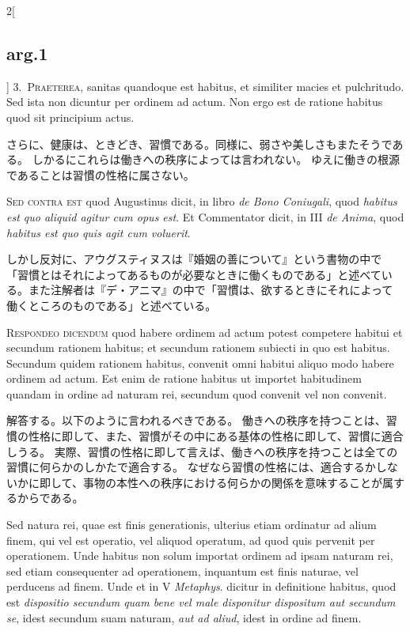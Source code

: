 \documentclass[paper=a4paper,fontsize=10pt,jafontsize=9pt,titlepage]{jlreq}
\begin{document}
\begin{paracol}{2}[\subsection{arg.1}]
3.~{\scshape Praeterea}, sanitas quandoque est habitus, et similiter macies et
pulchritudo. Sed ista non dicuntur per ordinem ad actum. Non ergo est
de ratione habitus quod sit principium actus.

\switchcolumn

さらに、健康は、ときどき、習慣である。同様に、弱さや美しさもまたそうである。
しかるにこれらは働きへの秩序によっては言われない。
ゆえに働きの根源であることは習慣の性格に属さない。

\switchcolumn*[\subsection{s.c.}]

{\scshape Sed contra est} quod Augustinus dicit, in libro {\itshape de Bono Coniugali}, quod
{\itshape habitus est quo aliquid agitur cum opus est}. Et Commentator dicit, in
III {\itshape de Anima}, quod {\itshape habitus est quo quis agit cum voluerit}.

\switchcolumn

しかし反対に、アウグスティヌスは『婚姻の善について』という書物の中で
「習慣とはそれによってあるものが必要なときに働くものである」と述べてい
る。また注解者は『デ・アニマ』の中で「習慣は、欲するときにそれによって
働くところのものである」と述べている。


{\scshape Respondeo dicendum} quod habere ordinem ad actum potest competere
habitui et secundum rationem habitus; et secundum rationem subiecti in
quo est habitus. Secundum quidem rationem habitus, convenit omni
habitui aliquo modo habere ordinem ad actum. Est enim de ratione
habitus ut importet habitudinem quandam in ordine ad naturam rei,
secundum quod convenit vel non convenit.

\switchcolumn

解答する。以下のように言われるべきである。
働きへの秩序を持つことは、習慣の性格に即して、また、習慣がその中にある基体の性格に即して、習慣に適合しうる。
実際、習慣の性格に即して言えば、働きへの秩序を持つことは全ての習慣に何らかのしかたで適合する。
なぜなら習慣の性格には、適合するかしないかに即して、事物の本性への秩序における何らかの関係を意味することが属するからである。

\switchcolumn*

Sed natura rei, quae est
finis generationis, ulterius etiam ordinatur ad alium finem, qui vel
est operatio, vel aliquod operatum, ad quod quis pervenit per
operationem. Unde habitus non solum importat ordinem ad ipsam naturam
rei, sed etiam consequenter ad operationem, inquantum est finis
naturae, vel perducens ad finem. Unde et in V {\itshape Metaphys}. dicitur in
definitione habitus, quod est {\itshape dispositio secundum quam bene vel male
disponitur dispositum aut secundum se}, idest secundum suam naturam,
{\itshape aut ad aliud}, idest in ordine ad finem.


\end{paracol}
\end{document}
